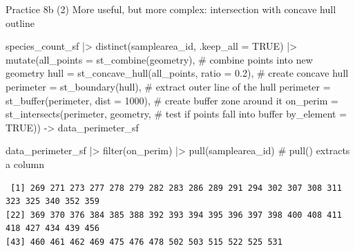 \documentclass[
  ignorenonframetext,
  aspectratio=169,
  t]{beamer}
\newenvironment{Shaded}{\begin{snugshade}}{\end{snugshade}}
\newcommand{\AttributeTok}[1]{\textcolor[rgb]{0.40,0.45,0.13}{#1}}
\newcommand{\CommentTok}[1]{\textcolor[rgb]{0.37,0.37,0.37}{#1}}
\newcommand{\ConstantTok}[1]{\textcolor[rgb]{0.56,0.35,0.01}{#1}}
\newcommand{\DecValTok}[1]{\textcolor[rgb]{0.68,0.00,0.00}{#1}}
\newcommand{\FloatTok}[1]{\textcolor[rgb]{0.68,0.00,0.00}{#1}}
\newcommand{\FunctionTok}[1]{\textcolor[rgb]{0.28,0.35,0.67}{#1}}
\newcommand{\NormalTok}[1]{\textcolor[rgb]{0.00,0.23,0.31}{#1}}
\newcommand{\OtherTok}[1]{\textcolor[rgb]{0.00,0.23,0.31}{#1}}
\newcommand{\SpecialCharTok}[1]{\textcolor[rgb]{0.37,0.37,0.37}{#1}}
\begin{document}
\begin{frame}[fragile]{Practice 8b (2)}
\protect{}\label{practice-8b-2}
More useful, but more complex: intersection with concave hull outline

\footnotesize

\begin{Shaded}
\begin{Highlighting}[]
\NormalTok{species\_count\_sf }\SpecialCharTok{|\textgreater{}} 
  \FunctionTok{distinct}\NormalTok{(samplearea\_id, }\AttributeTok{.keep\_all =} \ConstantTok{TRUE}\NormalTok{) }\SpecialCharTok{|\textgreater{}} 
  \FunctionTok{mutate}\NormalTok{(}\AttributeTok{all\_points =} \FunctionTok{st\_combine}\NormalTok{(geometry), }\CommentTok{\# combine points into new geometry}
         \AttributeTok{hull =} \FunctionTok{st\_concave\_hull}\NormalTok{(all\_points, }\AttributeTok{ratio =} \FloatTok{0.2}\NormalTok{), }\CommentTok{\# create concave hull}
         \AttributeTok{perimeter =} \FunctionTok{st\_boundary}\NormalTok{(hull), }\CommentTok{\# extract outer line of the hull}
         \AttributeTok{perimeter =} \FunctionTok{st\_buffer}\NormalTok{(perimeter, }\AttributeTok{dist =} \DecValTok{1000}\NormalTok{), }\CommentTok{\# create buffer zone around it}
         \AttributeTok{on\_perim =} \FunctionTok{st\_intersects}\NormalTok{(perimeter, geometry, }\CommentTok{\# test if points fall into buffer}
                                  \AttributeTok{by\_element =} \ConstantTok{TRUE}\NormalTok{)) }\OtherTok{{-}\textgreater{}}\NormalTok{ data\_perimeter\_sf }
  
\NormalTok{data\_perimeter\_sf }\SpecialCharTok{|\textgreater{}} 
    \FunctionTok{filter}\NormalTok{(on\_perim) }\SpecialCharTok{|\textgreater{}} 
    \FunctionTok{pull}\NormalTok{(samplearea\_id) }\CommentTok{\# pull() extracts a column}
\end{Highlighting}
\end{Shaded}

\begin{verbatim}
 [1] 269 271 273 277 278 279 282 283 286 289 291 294 302 307 308 311 323 325 340 352 359
[22] 369 370 376 384 385 388 392 393 394 395 396 397 398 400 408 411 418 427 434 439 456
[43] 460 461 462 469 475 476 478 502 503 515 522 525 531
\end{verbatim}

\normalsize
\end{frame}
\end{document}
